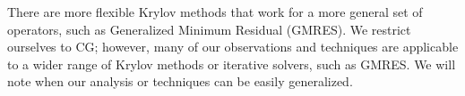 There are more flexible Krylov methods that work for a more general set of operators, such as Generalized Minimum Residual (GMRES).
We restrict ourselves to CG; however, many of our observations and techniques are applicable to a wider range of Krylov methods or iterative solvers, such as GMRES.
We will note when our analysis or techniques can be easily generalized.
